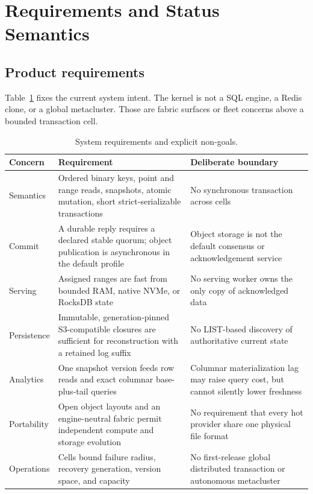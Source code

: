 \documentclass[sigconf,nonacm]{acmart}
\begin{document}
\section{Requirements and Status Semantics}

\subsection{Product requirements}

Table~\ref{tab:requirements} fixes the current system intent. The kernel is not
a SQL engine, a Redis clone, or a global metacluster. Those are fabric surfaces
or fleet concerns above a bounded transaction cell.

\begin{table}[t]
  \centering
  \small
  \caption{System requirements and explicit non-goals.}
  \label{tab:requirements}
  \begin{tabularx}{\textwidth}{@{}p{}X X@{}}
    \toprule
    Concern & Requirement & Deliberate boundary \\
    \midrule
    Semantics & Ordered binary keys, point and range reads, snapshots, atomic
    mutation, short strict-serializable transactions & No synchronous
    transaction across cells \\
    Commit & A durable reply requires a declared stable quorum; object
    publication is asynchronous in the default profile & Object storage is not
    the default consensus or acknowledgement service \\
    Serving & Assigned ranges are fast from bounded RAM, native NVMe, or
    RocksDB state & No serving worker owns the only copy of acknowledged data \\
    Persistence & Immutable, generation-pinned S3-compatible closures are
    sufficient for reconstruction with a retained log suffix & No LIST-based
    discovery of authoritative current state \\
    Analytics & One snapshot version feeds row reads and exact columnar
    base-plus-tail queries & Columnar materialization lag may raise query cost,
    but cannot silently lower freshness \\
    Portability & Open object layouts and an engine-neutral fabric permit
    independent compute and storage evolution & No requirement that every hot
    provider share one physical file format \\
    Operations & Cells bound failure radius, recovery generation, version
    space, and capacity & No first-release global distributed transaction or
    autonomous metacluster \\
    \bottomrule
  \end{tabularx}
\end{table}
\end{document}
